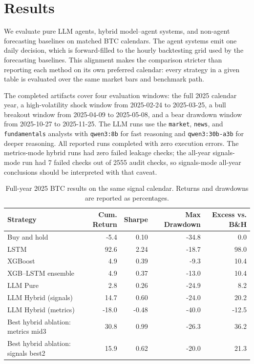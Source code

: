 
\section{Results}

We evaluate pure LLM agents, hybrid model--agent systems, and non-agent forecasting baselines on matched BTC calendars.  The agent systems emit one daily decision, which is forward-filled to the hourly backtesting grid used by the forecasting baselines.  This alignment makes the comparison stricter than reporting each method on its own preferred calendar: every strategy in a given table is evaluated over the same market bars and benchmark path.

The completed artifacts cover four evaluation windows: the full 2025 calendar year, a high-volatility shock window from 2025-02-24 to 2025-03-25, a bull breakout window from 2025-04-09 to 2025-05-08, and a bear drawdown window from 2025-10-27 to 2025-11-25.  The LLM runs use the \texttt{market}, \texttt{news}, and \texttt{fundamentals} analysts with \texttt{qwen3:8b} for fast reasoning and \texttt{qwen3:30b-a3b} for deeper reasoning.  All reported runs completed with zero execution errors.  The metrics-mode hybrid runs had zero failed leakage checks; the all-year signals-mode run had 7 failed checks out of 2555 audit checks, so signals-mode all-year conclusions should be interpreted with that caveat.

\begin{table}[h]
\centering
\caption{Full-year 2025 BTC results on the same signal calendar.  Returns and drawdowns are reported as percentages.}
\label{tab:all_year_results}
\begin{tabular}{lrrrr}
\toprule
Strategy & Cum. Return & Sharpe & Max Drawdown & Excess vs. B\&H \\
\midrule
Buy and hold & -5.4 & 0.10 & -34.8 & 0.0 \\
LSTM & 92.6 & 2.24 & -18.7 & 98.0 \\
XGBoost & 4.9 & 0.39 & -9.3 & 10.4 \\
XGB--LSTM ensemble & 4.9 & 0.37 & -13.0 & 10.4 \\
LLM Pure & 2.8 & 0.26 & -24.9 & 8.2 \\
LLM Hybrid (signals) & 14.7 & 0.60 & -24.0 & 20.2 \\
LLM Hybrid (metrics) & -18.0 & -0.48 & -40.0 & -12.5 \\
Best hybrid ablation: metrics mid3 & 30.8 & 0.99 & -26.3 & 36.2 \\
Best hybrid ablation: signals best2 & 15.9 & 0.62 & -20.0 & 21.3 \\
\bottomrule
\end{tabular}
\end{table}

